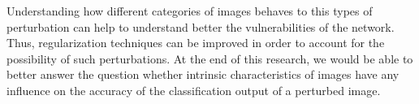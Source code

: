 \documentclass{article}
\begin{document}
Understanding how different categories of images behaves to this types of perturbation can help to understand better the vulnerabilities of the network. Thus, regularization techniques can be improved in order to account for the possibility of such perturbations. At the end of this research, we would be able to better answer the question whether intrinsic characteristics of images have any influence on the accuracy of the classification output of a perturbed image.

\pagebreak


\end{document}
